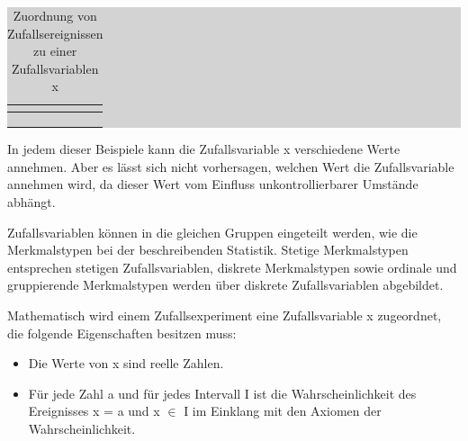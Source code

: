 \begin{table}[H]
\setlength{\arrayrulewidth}{.1em}
\caption{Zuordnung von Zufallsereignissen zu einer Zufallsvariablen x}
\setlength{\fboxsep}{0pt}%
\colorbox{lightgray}{%
%
\begin{tabular}{| l | l |}
\hline
\parbox[c][0.28in][c]{3.3in}{\smallskip\centering\textbf{\selectfont{Zufallsvariable x}}} & 
\parbox[c][0.28in][c]{3.3in}{\smallskip\centering\textbf{\selectfont{Ergebnis des Experimentes}}}\\ \hline

\parbox[c][0.5in][c]{3.3in}{\centering{}\selectfont{1}} 
& 
\parbox[c][0.5in][c]{3.3in}{\centering{}\selectfont{abc\\ bac}}\\ \hline

\parbox[c][0.5in][c]{3.3in}{\centering{}\selectfont{2}} & 
\parbox[c][0.5in][c]{3.3in}{\centering{}\selectfont{cab\\ acb}}\\ \hline

\parbox[c][0.5in][c]{3.3in}{\centering{}\selectfont{3}} & 
\parbox[c][0.5in][c]{3.3in}{\centering{}\selectfont{bca\\ cba}}\\ \hline

\end{tabular}%
}
\label{tab:fourone}
\end{table}

\noindent In jedem dieser Beispiele kann die Zufallsvariable x verschiedene Werte annehmen. Aber es l\"{a}sst sich nicht vorhersagen, welchen Wert die Zufallsvariable annehmen wird, da dieser Wert vom Einfluss unkontrollierbarer Umst\"{a}nde abh\"{a}ngt.\newline

\noindent Zufallsvariablen k\"{o}nnen in die gleichen Gruppen eingeteilt werden, wie die Merkmalstypen bei der beschreibenden Statistik. Stetige Merkmalstypen entsprechen stetigen Zufallsvariablen, diskrete Merkmalstypen sowie ordinale und gruppierende Merkmalstypen werden \"{u}ber diskrete Zufallsvariablen abgebildet. \newline

\noindent Mathematisch wird einem Zufallsexperiment eine Zufallsvariable x zugeordnet, die folgende Eigenschaften besitzen muss:

\begin{itemize}
    \item   Die Werte von x sind reelle Zahlen.
    \item  F\"{u}r jede Zahl a und f\"{u}r jedes Intervall I ist die Wahrscheinlichkeit des Ereignisses x = a und x $\in$ I im Einklang mit den Axiomen der Wahrscheinlichkeit.
\end{itemize}

